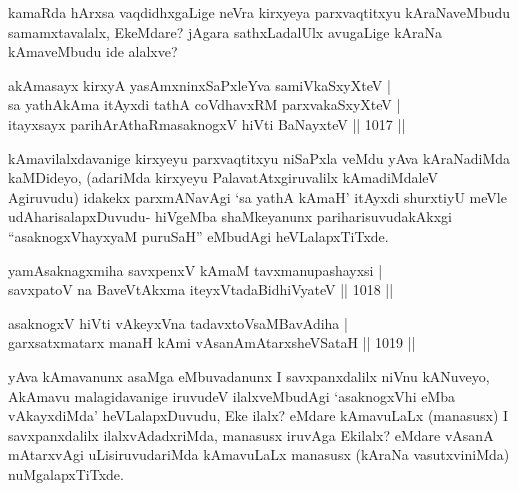\begin{artha}
kamaRda hArxsa vaqdidhxgaLige neVra kirxyeya parxvaqtitxyu kAraNaveMbudu samamxtavalalx, EkeMdare? jAgara sathxLadalUlx avugaLige kAraNa kAmaveMbudu ide alalxve?
\end{artha}


\begin{shl}
akAmasayx kirxyA yasAmxninxSaPxleYva samiVkaSxyXteV | \\
sa yathAkAma itAyxdi tathA coVdhavxRM parxvakaSxyXteV | \\
itayxsayx parihArAthaRmasaknogxV hiVti BaNayxteV \hfill||  1017 ||  
\end{shl}

\begin{artha}
kAmavilalxdavanige kirxyeyu parxvaqtitxyu niSaPxla veMdu yAva kAraNadiMda kaMDideyo, (adariMda kirxyeyu PalavatAtxgiruvalilx kAmadiMdaleV Agiruvudu) idakekx parxmANavAgi `sa yathA kAmaH' itAyxdi shurxtiyU meVle udAharisalapxDuvudu- hiVgeMba shaMkeyanunx pariharisuvudakAkxgi ``asaknogxVhayxyaM puruSaH'' eMbudAgi heVLalapxTiTxde.
\end{artha}


\begin{shl}
yamAsaknagxmiha savxpenxV kAmaM tavxmanupashayxsi | \\
savxpatoV na BaveVtAkxma iteyxVtadaBidhiVyateV \hfill||  1018 ||  
\end{shl}
				
\begin{shl}
asaknogxV hiVti vAkeyxVna tadavxtoV\s saMBavAdiha | \\
garxsatxmatarx manaH kAmi vAsanAmAtarxsheVSataH \hfill||  1019 ||  
\end{shl}

\begin{artha}
yAva kAmavanunx asaMga eMbuvadanunx I savxpanxdalilx niVnu kANuveyo, AkAmavu malagidavanige iruvudeV ilalxveMbudAgi `asaknogxVhi eMba vAkayxdiMda' heVLalapxDuvudu, Eke ilalx? eMdare kAmavuLaLx (manasusx) I savxpanxdalilx ilalxvAdadxriMda, manasusx iruvAga Ekilalx? eMdare vAsanA mAtarxvAgi uLisiruvudariMda kAmavuLaLx manasusx (kAraNa vasutxviniMda) nuMgalapxTiTxde.
\end{artha}

